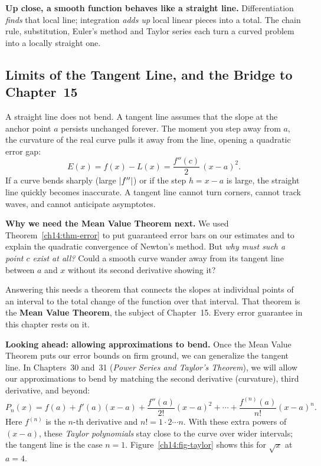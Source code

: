 \begin{aestheticbox}
\textbf{Up close, a smooth function behaves like a straight line.} Differentiation \emph{finds} that local line; integration \emph{adds up} local linear pieces into a total. The chain rule, substitution, Euler's method and Taylor series each turn a curved problem into a locally straight one.
\end{aestheticbox}

\subsection{Limits of the Tangent Line, and the Bridge to Chapter~15}
\label{ch14:what-unlocked}

\begin{connectionbox}
A straight line does not bend. A tangent line assumes that the slope at the anchor point $a$ persists unchanged forever. The moment you step away from $a$, the curvature of the real curve pulls it away from the line, opening a quadratic error gap:
\[
  E(x) = f(x) - L(x) = \frac{f''(c)}{2}\,(x-a)^2.
\]
If a curve bends sharply (large $\lvert f''\rvert$) or if the step $h = x - a$ is large, the straight line quickly becomes inaccurate. A tangent line cannot turn corners, cannot track waves, and cannot anticipate asymptotes.

\textbf{Why we need the Mean Value Theorem next.}
We used Theorem~\ref{ch14:thm-error} to put guaranteed error bars on our estimates and to explain the quadratic convergence of Newton's method. But \emph{why must such a point $c$ exist at all?} Could a smooth curve wander away from its tangent line between $a$ and $x$ without its second derivative showing it?

Answering this needs a theorem that connects the slopes at individual points of an interval to the total change of the function over that interval. That theorem is the \textbf{Mean Value Theorem}, the subject of Chapter~15. Every error guarantee in this chapter rests on it.

\textbf{Looking ahead: allowing approximations to bend.}
Once the Mean Value Theorem puts our error bounds on firm ground, we can generalize the tangent line. In Chapters~30 and~31 (\emph{Power Series and Taylor's Theorem}), we will allow our approximations to bend by matching the second derivative (curvature), third derivative, and beyond:
\[
  P_n(x) = f(a) + f'(a)(x-a) + \frac{f''(a)}{2!}(x-a)^2 + \cdots + \frac{f^{(n)}(a)}{n!}(x-a)^n.
\]
Here $f^{(n)}$ is the $n$-th derivative and $n! = 1\cdot 2\cdots n$. With these extra powers of $(x-a)$, these \emph{Taylor polynomials} stay close to the curve over wider intervals; the tangent line is the case $n=1$. Figure~\ref{ch14:fig-taylor} shows this for $\sqrt{x}$ at $a=4$.
\end{connectionbox}

